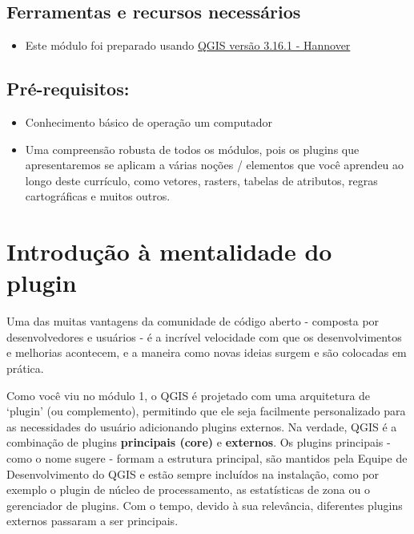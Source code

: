 \documentclass[
  portuguese,
]{krantz}
\providecommand{\tightlist}{%
  \setlength{\itemsep}{0pt}\setlength{\parskip}{0pt}}
\begin{document}
\hypertarget{ferramentas-e-recursos-necessuxe1rios-9}{%
\subsection{Ferramentas e recursos necessários}\label{ferramentas-e-recursos-necessuxe1rios-9}}

\begin{itemize}
\tightlist
\item
  Este módulo foi preparado usando \href{https://qgis.org/en/site/forusers/download.html}{QGIS versão 3.16.1 - Hannover}
\end{itemize}

\hypertarget{pruxe9-requisitos-10}{%
\subsection{Pré-requisitos:}\label{pruxe9-requisitos-10}}

\begin{itemize}
\tightlist
\item
  Conhecimento básico de operação um computador
\item
  Uma compreensão robusta de todos os módulos, pois os plugins que apresentaremos se aplicam a várias noções / elementos que você aprendeu ao longo deste currículo, como vetores, rasters, tabelas de atributos, regras cartográficas e muitos outros.
\end{itemize}

\hypertarget{introduuxe7uxe3o-uxe0-mentalidade-do-plugin}{%
\section{Introdução à mentalidade do plugin}\label{introduuxe7uxe3o-uxe0-mentalidade-do-plugin}}

Uma das muitas vantagens da comunidade de código aberto - composta por desenvolvedores e usuários - é a incrível velocidade com que os desenvolvimentos e melhorias acontecem, e a maneira como novas ideias surgem e são colocadas em prática.

Como você viu no módulo 1, o QGIS é projetado com uma arquitetura de `plugin' (ou complemento), permitindo que ele seja facilmente personalizado para as necessidades do usuário adicionando plugins externos. Na verdade, QGIS é a combinação de plugins \textbf{principais (core)} e \textbf{externos}. Os plugins principais - como o nome sugere - formam a estrutura principal, são mantidos pela Equipe de Desenvolvimento do QGIS e estão sempre incluídos na instalação, como por exemplo o plugin de núcleo de processamento, as estatísticas de zona ou o gerenciador de plugins. Com o tempo, devido à sua relevância, diferentes plugins externos passaram a ser principais.
\end{document}
